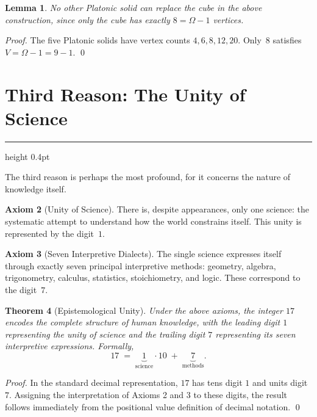 \documentclass[11pt]{article}
\theoremstyle{plain}
\newtheorem{theorem}{Theorem}[section]
\newtheorem{lemma}[theorem]{Lemma}
\theoremstyle{definition}
\newtheorem{axiom}[theorem]{Axiom}
\theoremstyle{remark}
\newcommand{\sectionrule}{%
  \vspace{2pt}%
  {\color{rulegray}\hrule height 0.4pt}%
  \vspace{8pt}%
}
\begin{document}
\begin{lemma}
No other Platonic solid can replace the cube in the above construction,
since only the cube has exactly $8 = \Omega - 1$ vertices.
\end{lemma}

\begin{proof}
The five Platonic solids have vertex counts $4, 6, 8, 12, 20$. Only~$8$
satisfies $V = \Omega - 1 = 9 - 1$. \qed
\end{proof}

\section{Third Reason: The Unity of Science}
\sectionrule

The third reason is perhaps the most profound, for it concerns the nature of
knowledge itself.

\begin{axiom}[Unity of Science]
There is, despite appearances, only one science: the systematic attempt to
understand how the world constrains itself. This unity is represented by the
digit~$1$.
\end{axiom}

\begin{axiom}[Seven Interpretive Dialects]
The single science expresses itself through exactly seven principal
interpretive methods: geometry, algebra, trigonometry, calculus, statistics,
stoichiometry, and logic. These correspond to the digit~$7$.
\end{axiom}

\begin{theorem}[Epistemological Unity]
\label{thm:science}
Under the above axioms, the integer $17$ encodes the complete structure of
human knowledge, with the leading digit $1$ representing the unity of science
and the trailing digit $7$ representing its seven interpretive expressions.
Formally,
\[
    17 \;=\; \underbrace{1}_{\text{science}} \cdot 10 \;+\; \underbrace{7}_{\text{methods}}.
\]
\end{theorem}

\begin{proof}
In the standard decimal representation, $17$ has tens digit $1$ and units
digit $7$. Assigning the interpretation of Axioms 2 and 3 to these digits,
the result follows immediately from the positional value definition of decimal
notation. \qed
\end{proof}
\end{document}
